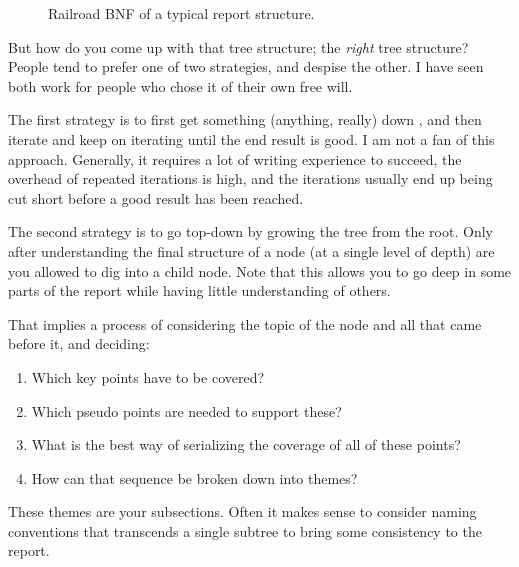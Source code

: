 \documentclass[a4paper, oneside]{memoir}
\begin{document}
\begin{figure}
\begin{adjustbox}{trim=2.4cm 0 0 0mm}
{
      }
    \end{adjustbox}
  \caption{\label{fig:firststeps:process:bnf} Railroad BNF of a typical report structure.}
\end{figure}

But how do you come up with that tree structure; the \textsl{right} tree structure? People tend to prefer one of two strategies, and despise the other. I have seen both work for people who chose it of their own free will.

The first strategy is to first get something (anything, really) down , and then iterate and keep on iterating until the end result is good. I am not a fan of this approach. Generally, it requires a lot of writing experience to succeed, the overhead of repeated iterations is high, and the iterations usually end up being cut short before a good result has been reached.

The second strategy is to go top-down by growing the tree from the root. Only after understanding the final structure of a node (at a single level of depth) are you allowed to dig into a child node. Note that this allows you to go deep in some parts of the report while having little understanding of others.

That implies a process of considering the topic of the node and all that came before it, and deciding:
\begin{enumerate}
  \item Which key points have to be covered?
  \item Which pseudo points are needed to support these?
  \item What is the best way of serializing the coverage of all of these points?
  \item How can that sequence be broken down into themes?
\end{enumerate}
These themes are your subsections. Often it makes sense to consider naming conventions that transcends a single subtree to bring some consistency to the report.
\end{document}
